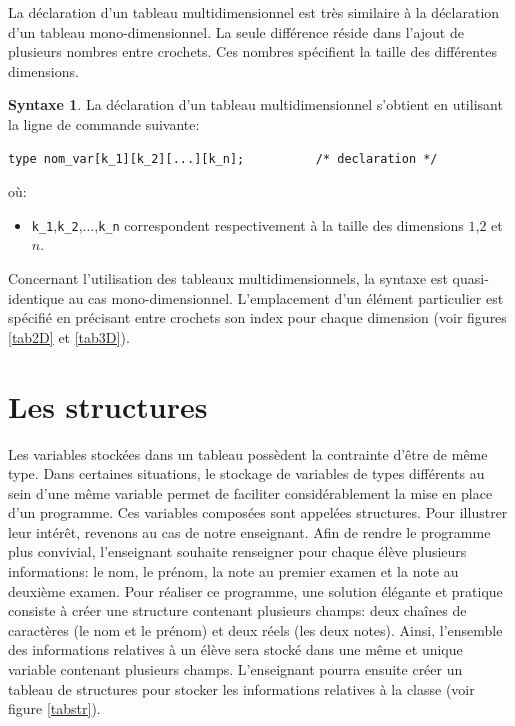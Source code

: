 \documentclass[a4paper,11pt]{book}
\theoremstyle{definition}
\newtheorem*{syntaxe}{Syntaxe}
\begin{document}
La déclaration d'un tableau multidimensionnel est très similaire à la déclaration d'un tableau mono-dimensionnel. La seule différence réside dans l'ajout de plusieurs nombres entre crochets. Ces nombres spécifient la taille des différentes dimensions.
\begin{syntaxe}La déclaration d'un tableau multidimensionnel s'obtient en utilisant la ligne de commande suivante:
\begin{lstlisting}
type nom_var[k_1][k_2][...][k_n];          /* declaration */
\end{lstlisting}
où:
\begin{itemize}
\item \texttt{k\_1},\texttt{k\_2},...,\texttt{k\_n} correspondent respectivement à la taille des dimensions $1$,$2$ et $n$.
\end{itemize}
\end{syntaxe}
Concernant l'utilisation des tableaux multidimensionnels, la syntaxe est quasi-identique au cas mono-dimensionnel. L'emplacement d'un élément particulier est spécifié en précisant entre crochets son index pour chaque dimension (voir figures \ref{tab2D} et \ref{tab3D}).


\section{Les structures}
Les variables stockées dans un tableau possèdent la contrainte d'être de même type. Dans certaines situations, le stockage de variables de types différents au sein d'une même variable permet de faciliter considérablement la mise en place d'un programme. Ces variables composées sont appelées structures. Pour illustrer leur intérêt, revenons au cas de notre enseignant. Afin de rendre le programme plus convivial, l'enseignant souhaite renseigner pour chaque élève plusieurs informations: le nom, le prénom, la note au premier examen et la note au deuxième examen. Pour réaliser ce programme, une solution élégante et pratique consiste à créer une structure contenant plusieurs champs: deux chaînes de caractères (le nom et le prénom) et deux réels (les deux notes). Ainsi, l'ensemble des informations relatives à un élève sera stocké dans une même et unique variable contenant plusieurs champs. L'enseignant pourra ensuite créer un tableau de structures pour stocker les informations relatives à la classe (voir figure \ref{tabstr}).
\end{document}
